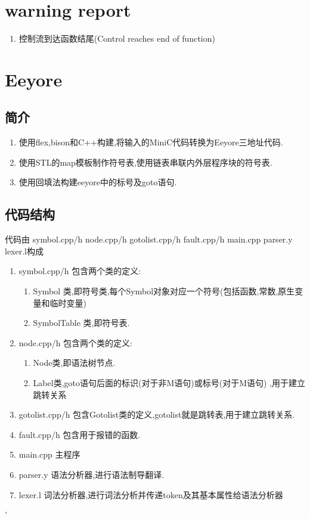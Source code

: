 \documentclass[UTF8]{article}
\begin{document}
\section{warning report}
\begin{enumerate}
\item 控制流到达函数结尾(Control reaches end of function)
\end{enumerate}
\section{Eeyore}
\subsection{简介}
\begin{enumerate}[1.]
\item 使用flex,bison和C++构建,将输入的MiniC代码转换为Eeyore三地址代码.
\item 使用STL的map模板制作符号表,使用链表串联内外层程序块的符号表.
\item 使用回填法构建eeyore中的标号及goto语句.
\end{enumerate}
\subsection{代码结构}
代码由 symbol.cpp/h node.cpp/h gotolist.cpp/h fault.cpp/h main.cpp parser.y lexer.l构成
\begin{enumerate}
\item symbol.cpp/h 包含两个类的定义:
\begin{enumerate}[(1)]
\item Symbol 类,即符号类,每个Symbol对象对应一个符号(包括函数,常数,原生变量和临时变量)
\item SymbolTable 类,即符号表.
\end{enumerate}
\item node.cpp/h 包含两个类的定义:
\begin{enumerate}[(1)]
\item Node类,即语法树节点.
\item Label类,goto语句后面的标识(对于非M语句)或标号(对于M语句) ,用于建立跳转关系
\end{enumerate}
\item gotolist.cpp/h 包含Gotolist类的定义,gotolist就是跳转表,用于建立跳转关系.
\item fault.cpp/h 包含用于报错的函数.
\item main.cpp 主程序
\item parser.y 语法分析器,进行语法制导翻译.
\item lexer.l 词法分析器,进行词法分析并传递token及其基本属性给语法分析器
\end{enumerate}'
\end{document}
